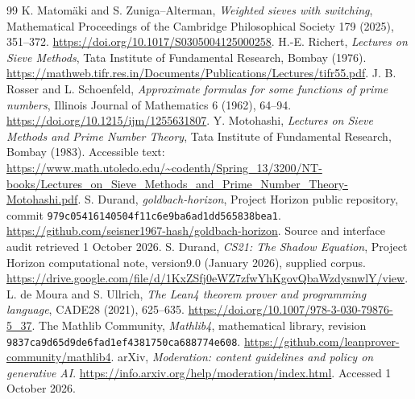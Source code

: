 \documentclass[11pt,a4paper]{article}
\theoremstyle{definition}
\theoremstyle{remark}
\begin{document}
\begin{thebibliography}{99}
 K. Matom\"aki and S. Zuniga--Alterman, \emph{Weighted sieves with switching}, Mathematical Proceedings of the Cambridge Philosophical Society 179 (2025), 351--372. \url{https://doi.org/10.1017/S0305004125000258}.
 H.-E. Richert, \emph{Lectures on Sieve Methods}, Tata Institute of Fundamental Research, Bombay (1976). \url{https://mathweb.tifr.res.in/Documents/Publications/Lectures/tifr55.pdf}.
 J. B. Rosser and L. Schoenfeld, \emph{Approximate formulas for some functions of prime numbers}, Illinois Journal of Mathematics 6 (1962), 64--94. \url{https://doi.org/10.1215/ijm/1255631807}.
 Y. Motohashi, \emph{Lectures on Sieve Methods and Prime Number Theory}, Tata Institute of Fundamental Research, Bombay (1983). Accessible text: \url{https://www.math.utoledo.edu/~codenth/Spring_13/3200/NT-books/Lectures_on_Sieve_Methods_and_Prime_Number_Theory-Motohashi.pdf}.
 S. Durand, \emph{goldbach-horizon}, Project Horizon public repository, commit \nolinkurl{979c05416140504f11c6e9ba6ad1dd565838bea1}. \url{https://github.com/seisner1967-hash/goldbach-horizon}. Source and interface audit retrieved 1 October 2026.
 S. Durand, \emph{CS21: The Shadow Equation}, Project Horizon computational note, version9.0 (January 2026), supplied corpus. \url{https://drive.google.com/file/d/1KxZSfj0eWZ7zfwYhKgovQbaWzdysnwlY/view}.
 L. de Moura and S. Ullrich, \emph{The Lean4 theorem prover and programming language}, CADE28 (2021), 625--635. \url{https://doi.org/10.1007/978-3-030-79876-5_37}.
 The Mathlib Community, \emph{Mathlib4}, mathematical library, revision \nolinkurl{9837ca9d65d9de6fad1ef4381750ca688774e608}. \url{https://github.com/leanprover-community/mathlib4}.
 arXiv, \emph{Moderation: content guidelines and policy on generative AI}. \url{https://info.arxiv.org/help/moderation/index.html}. Accessed 1 October 2026.
\end{thebibliography}
\end{document}
